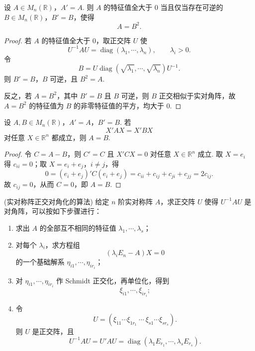 \begin{example}
	设 $A\in M_n(\mathbb{R})$，$A'=A$. 则 $A$ 的特征值全大于 $0$ 当且仅当存在可逆的 $B\in M_n(\mathbb{R})$，$B'=B$，使得
	\[
	A=B^2.
	\]
\end{example}
\begin{proof}
	若 $A$ 的特征值全大于 $0$，取正交阵 $U$ 使
	\[
	U^{-1}AU=\operatorname{diag}(\lambda_1,\cdots,\lambda_n),
	\qquad \lambda_i>0.
	\]
	令
	\[
	B=U\operatorname{diag}(\sqrt{\lambda_1},\cdots,\sqrt{\lambda_n})U^{-1}.
	\]
	则 $B'=B$，$B$ 可逆，且 $B^2=A$.
	
	反之，若 $A=B^2$，其中 $B'=B$ 且 $B$ 可逆，则 $B$ 正交相似于实对角阵，故 $A=B^2$ 的特征值为 $B$ 的非零特征值的平方，均大于 $0$.
\end{proof}

\begin{example}
	设 $A,B\in M_n(\mathbb{R})$，$A'=A$，$B'=B$. 若
	\[
	X'AX=X'BX
	\]
	对任意 $X\in\mathbb{R}^n$ 都成立，则 $A=B$.
\end{example}
\begin{proof}
	令 $C=A-B$，则 $C'=C$ 且 $X'CX=0$ 对任意 $X\in\mathbb{R}^n$ 成立. 取 $X=e_i$ 得 $c_{ii}=0$；取 $X=e_i+e_j$，$i\ne j$，得
	\[
	0=(e_i+e_j)'C(e_i+e_j)=c_{ii}+c_{ij}+c_{ji}+c_{jj}=2c_{ij}.
	\]
	故 $c_{ij}=0$，从而 $C=0$，即 $A=B$.
\end{proof}


\begin{algo}(实对称阵正交对角化的算法)
	给定 $n$ 阶实对称阵 $A$，求正交阵 $U$ 使得 $U^{-1}AU$ 是对角阵，可以按如下步骤进行：
	\begin{enumerate}
		\item 求出 $A$ 的全部互不相同的特征值 $\lambda_1,\cdots,\lambda_s$；
		\item 对每个 $\lambda_i$，求方程组
		\[
		(\lambda_iE_n-A)X=0
		\]
		的一个基础解系 $\eta_{i1},\cdots,\eta_{ir_i}$；
		\item 对 $\eta_{i1},\cdots,\eta_{ir_i}$ 作 Schmidt 正交化，再单位化，得到
		\[
		\xi_{i1},\cdots,\xi_{ir_i};
		\]
		\item 令
		\[
		U=(\xi_{11}\cdots\xi_{1r_1}\ \cdots\ \xi_{s1}\cdots\xi_{sr_s}).
		\]
		则 $U$ 是正交阵，且
		\[
		U^{-1}AU=U'AU=\operatorname{diag}(\lambda_1E_{r_1},\cdots,\lambda_sE_{r_s}).
		\]
		\end{enumerate}
\end{algo}

